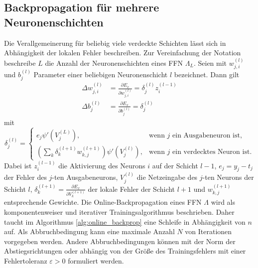 \subsection*{Backpropagation für mehrere Neuronenschichten}
Die Verallgemeinerung für beliebig viele verdeckte Schichten lässt sich in Abhängigkeit der lokalen Fehler beschreiben. Zur Vereinfachung der Notation beschreibe $L$ die Anzahl der Neuronenschichten eines FFN $\Lambda_L$. Seien mit $w^{(l)}_{j,i}$ und $b^{(l)}_j$ Parameter einer beliebigen Neuronenschicht $l$ bezeichnet. Dann gilt 
\begin{align*}
    \Delta w^{(l)}_{j,i}&= \frac{\partial E_x}{\partial w^{(l)}_{j,i}}= \delta^{(l)}_j z^{(l-1)}_i \\
    \Delta b^{(l)}_{j}&= \frac{\partial E_x}{\partial b^{(l)}_{j}}= \delta^{(l)}_j
\end{align*}
mit 
\begin{equation*}
    \delta^{(l)}_j=
    \begin{cases}
        e_j \psi'(V^{(L)}_j), &\text{wenn $j$ ein Ausgabeneuron ist}, \\
        \left(\sum_{k} \delta^{(l+1)}_k w^{(l+1)}_{k,j}\right) \psi'(V_j^{(l)}), &\text{wenn $j$ ein verdecktes Neuron ist}.
    \end{cases}
\end{equation*}
Dabei ist $z^{(l-1)}_i$ die Aktivierung des Neurons $i$ auf der Schicht $l-1$, $e_j=y_j-t_j$ der Fehler des $j$-ten Ausgabeneurons, $V^{(l)}_j$ die Netzeingabe des $j$-ten Neurons der Schicht $l$, $\delta^{(l+1)}_k= \frac{\partial E_x}{\partial V^{(l+1)}_k}$ der lokale Fehler der Schicht $l+1$ und $w^{(l+1)}_{k,j}$ entsprechende Gewichte. 
Die Online-Backpropagation eines FFN $\Lambda$ wird als komponentenweiser und iterativer Trainingsalgorithmus beschrieben. Daher taucht im Algorithmus \ref{alg:online_backprop} eine Schleife in Abhängigkeit von $n$ auf. Als Abbruchbedingung kann eine maximale Anzahl $N$ von Iterationen vorgegeben werden. Andere Abbruchbedingungen können mit der Norm der Abstiegsrichtungen oder abhängig von der Größe des Trainingsfehlers mit einer Fehlertoleranz $\varepsilon >0$ formuliert werden.

